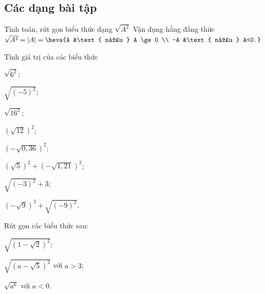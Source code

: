 \subsection{Các dạng bài tập}
\begin{dang}{Tính toán, rút gọn biểu thức dạng $\sqrt{A^2}$}
	Vận dụng hằng đẳng thức $\sqrt{A^2} = \left|A\right| = \heva{A &\text{ nếu } A \ge 0 \\ -A &\text{ nếu } A<0.}$
\end{dang}
\begin{vd}
	Tính giá trị của các biểu thức
	\begin{listEX}[4]
	\item $\sqrt{6^2}$;
	\item $\sqrt{(-5)^2}$;
	\item $\sqrt{16^{2}}$;
	\item $(\sqrt{12})^{2}$;
	\item $(-\sqrt{0{,}36})^{2}$;
	\item $(\sqrt{5})^{2}+(-\sqrt{1{,}21})^{2}$;
	\item $\sqrt{\left(-3\right)^2}+3$;
	\item $(-\sqrt{9})^{2}+\sqrt{(-9)^{2}}$.
	\end{listEX}
\end{vd}
\begin{vd} %
	Rút gọn các biểu thức sau:
	\begin{enumEX}{3}
	\item $\sqrt{(1-\sqrt{2})^{2}}$;
	\item $\sqrt{(a-\sqrt{5})^{2}}$ với $a>3$;
	\item $\sqrt{a^{6}}$ với $a<0$.
	\end{enumEX}
\end{vd}
